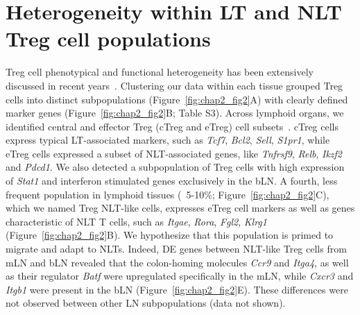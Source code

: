 \section{Heterogeneity within LT and NLT Treg cell populations}
\label{section2.3}
Treg cell phenotypical and functional heterogeneity has been extensively discussed in recent years~\citep{Josefowicz2012-nh,Campbell2011-uc}. Clustering our data within each tissue grouped Treg cells into distinct subpopulations (Figure~\ref{fig:chap2_fig2}A) with clearly defined marker genes (Figure~\ref{fig:chap2_fig2}B; Table S3). Across lymphoid organs, we identified central and effector Treg (cTreg and eTreg) cell subsets~\citep{Cretney2011-zd,Vasanthakumar2015-jw}. cTreg cells express typical LT-associated markers, such as \textit{Tcf7}, \textit{Bcl2}, \textit{Sell}, \textit{S1pr1}, while eTreg cells expressed a subset of NLT-associated genes, like \textit{Tnfrsf9}, \textit{Relb}, \textit{Ikzf2} and \textit{Pdcd1}. We also detected a subpopulation of Treg cells with high expression of \textit{Stat1} and interferon stimulated genes exclusively in the bLN. A fourth, less frequent population in lymphoid tissues (~5-10\%; Figure~\ref{fig:chap2_fig2}C), which we named Treg NLT-like cells, expresses eTreg cell markers as well as genes characteristic of NLT T cells, such as \textit{Itgae}, \textit{Rora}, \textit{Fgl2}, \textit{Klrg1} (Figure~\ref{fig:chap2_fig2}B). We hypothesize that this population is primed to migrate and adapt to NLTs. Indeed, DE genes between NLT-like Treg cells from mLN and bLN revealed that the colon-homing molecules \textit{Ccr9} and \textit{Itga4}, as well as their regulator \textit{Batf} were upregulated specifically in the mLN, while \textit{Cxcr3} and \textit{Itgb1} were present in the bLN (Figure~\ref{fig:chap2_fig2}E). These differences were not observed between other LN subpopulations (data not shown).

